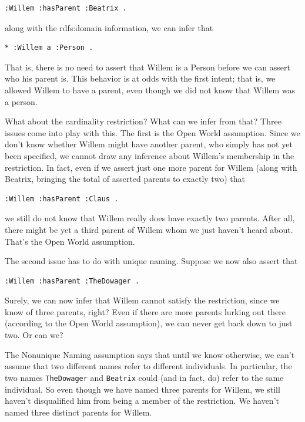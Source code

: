 \begin{lstlisting}
:Willem :hasParent :Beatrix .
\end{lstlisting}

along with the rdfs:domain information, we can infer that

\begin{lstlisting}
* :Willem a :Person .
\end{lstlisting}

That is, there is no need to assert that Willem is a Person before we
can assert who his parent is. This behavior is at odds with the first
intent; that is, we allowed Willem to have a parent, even though we did
not know that Willem was a person.

What about the cardinality restriction? What can we infer from that?
Three issues come into play with this. The first is the Open World
assumption. Since we don't know whether Willem might have another
parent, who simply has not yet been specified, we cannot draw any
inference about Willem's membership in the restriction. In fact, even if
we assert just one more parent for Willem (along with Beatrix, bringing
the total of asserted parents to exactly two) that

\begin{lstlisting}
:Willem :hasParent :Claus .
\end{lstlisting}

we still do not know that Willem really does have exactly two parents.
After all, there might be yet a third parent of Willem whom we just
haven't heard about. That's the Open World assumption.

The second issue has to do with unique naming. Suppose we now also
assert that

\begin{lstlisting}
:Willem :hasParent :TheDowager .
\end{lstlisting}

Surely, we can now infer that Willem cannot satisfy the restriction,
since we know of three parents, right? Even if there are more parents
lurking out there (according to the Open World assumption), we can never
get back down to just two. Or can we?

The Nonunique Naming assumption says that until we know otherwise, we
can't assume that two different names refer to different individuals. In
particular, the two names \texttt{TheDowager} and \texttt{Beatrix} could (and in fact, do)
refer to the same individual. So even though we have named three parents
for Willem, we still haven't disqualified him from being a member of the
restriction. We haven't named three distinct parents for Willem.

